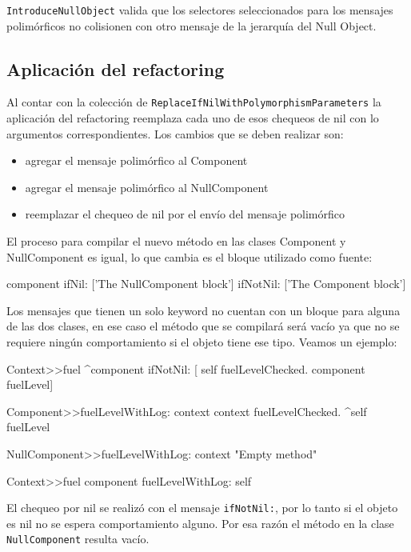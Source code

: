 \lstinline{IntroduceNullObject} valida que los selectores seleccionados para los mensajes polimórficos
no colisionen con otro mensaje de la jerarquía del Null Object. 


\subsection{Aplicación del refactoring}

Al contar con la colección de \lstinline{ReplaceIfNilWithPolymorphismParameters} la aplicación del
refactoring reemplaza cada uno de esos chequeos de nil con lo argumentos correspondientes. Los
cambios que se deben realizar son:

\begin{itemize}
    \item agregar el mensaje polimórfico al Component
    \item agregar el mensaje polimórfico al NullComponent
    \item reemplazar el chequeo de nil por el envío del mensaje polimórfico
\end{itemize}

El proceso para compilar el nuevo método en las clases Component y NullComponent es igual, lo que 
cambia es el bloque utilizado como fuente:

\begin{code}
component ifNil: ['The NullComponent block'] ifNotNil: ['The Component block']
\end{code}

Los mensajes que tienen un solo keyword no cuentan con un bloque para alguna de las dos clases, en
ese caso el método que se compilará será vacío ya que no se requiere ningún comportamiento si el
objeto tiene ese tipo. Veamos un ejemplo:

\begin{code}
Context>>fuel
    ^component ifNotNil: [
        self fuelLevelChecked.
        component fuelLevel]

Component>>fuelLevelWithLog: context
    context fuelLevelChecked.
    ^self fuelLevel

NullComponent>>fuelLevelWithLog: context
    "Empty method"

Context>>fuel
    component fuelLevelWithLog: self
\end{code}

El chequeo por nil se realizó con el mensaje \lstinline{ifNotNil:}, por lo tanto si el objeto es nil
no se espera comportamiento alguno. Por esa razón el método en la clase \lstinline{NullComponent} resulta
vacío.


